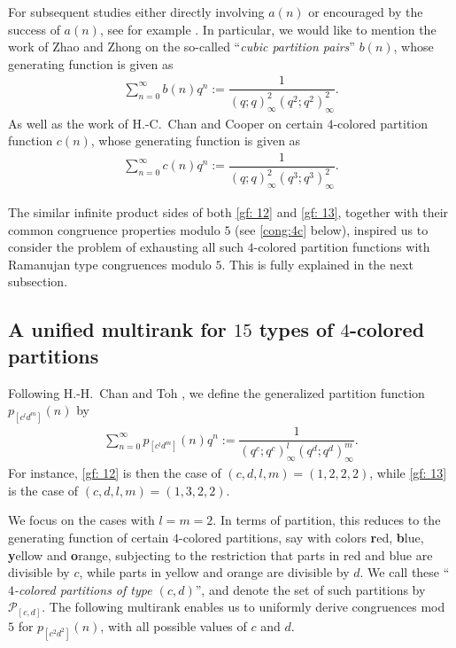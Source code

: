\documentclass[12pt]{amsart}
\numberwithin{equation}{section}
\theoremstyle{plain}
\theoremstyle{definition}
\begin{document}
For subsequent studies either directly involving $a(n)$ or encouraged by the success of $a(n)$, see for example \cite{BO,CC,CLi0,CT,Kim2,Kim3,Sin,Toh,Xio,ZZh,Zhou,ZZ}. In particular, we would like to mention the work of Zhao and Zhong \cite{ZZh} on the so-called ``\emph{cubic partition pairs}'' $b(n)$, whose generating function is given as
\begin{align}\label{gf: 12}
\sum_{n=0}^{\infty}b(n)q^{n}:=\dfrac{1}{(q;q)_{\infty}^{2}(q^{2};q^{2})_{\infty}^{2}}.
\end{align}
As well as the work of H.-C.~Chan and Cooper \cite{CC} on certain $4$-colored partition function $c(n)$, whose generating function is given as
\begin{align}\label{gf: 13}
\sum_{n=0}^{\infty}c(n)q^{n}:=\dfrac{1}{(q;q)_{\infty}^{2}(q^{3};q^{3})_{\infty}^{2}}.
\end{align}

The similar infinite product sides of both \eqref{gf: 12} and \eqref{gf: 13}, together with their common congruence properties modulo $5$ (see \eqref{cong:4c} below), inspired us to consider the problem of exhausting all such $4$-colored partition functions with Ramanujan type congruences modulo $5$. This is fully explained in the next subsection.

\subsection{A unified multirank for $15$ types of $4$-colored partitions}
Following H.-H.~Chan and Toh \cite{CT}, we define the generalized partition function $p_{[c^{l}d^{m}]}(n)$ by
\begin{align*}
\sum_{n=0}^{\infty}p_{[c^{l}d^{m}]}(n)q^{n}:=\dfrac{1}{(q^{c};q^{c})_{\infty}^{l}(q^{d};q^{d})_{\infty}^{m}}.
\end{align*}
For instance, \eqref{gf: 12} is then the case of $(c,d,l,m)=(1,2,2,2)$, while \eqref{gf: 13} is the case of $(c,d,l,m)=(1,3,2,2)$.

We focus on the cases with $l=m=2$. In terms of partition, this reduces to the generating function of certain $4$-colored partitions, say with colors {\bf r}ed, {\bf b}lue, {\bf y}ellow and {\bf o}range, subjecting to the restriction that parts in red and blue are divisible by $c$, while parts in yellow and orange are divisible by $d$. We call these ``\emph{$4$-colored partitions of type $(c,d)$}'', and denote the set of such partitions by $\mathcal{P}_{[c,d]}$. The following multirank enables us to uniformly derive congruences mod $5$ for $p_{[c^2d^2]}(n)$, with all possible values of $c$ and $d$.
\end{document}
